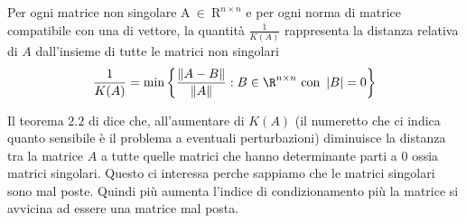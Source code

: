 \documentclass{article}
\begin{document}
\begin{theorem}
  Per ogni matrice non singolare $\mathrm{A} \ \mathrm{\in} \ \mathrm{R}^{n\times n}$ e per ogni norma di matrice compatibile con
una di vettore, la quantità $\frac{1 }{K(A)}$  rappresenta la distanza relativa di $A$ dall’insieme di tutte le matrici non singolari
$$
\frac{1}{K(A)}=\min\left\{\frac{\left\|A-B\right\|}{\left\|A\right\|}:B\in\R^{n\times n} \text{ con } \left|B\right|=0\right\}
$$
\end{theorem}
Il teorema $2.2$ di dice che, all'aumentare di $K(A)$ (il numeretto che ci indica quanto sensibile è il problema a eventuali perturbazioni) diminuisce la distanza tra la matrice $A $ a tutte quelle matrici che hanno determinante parti a $0$ ossia matrici singolari. Questo ci interessa perche sappiamo che le matrici singolari sono mal poste. Quindi più aumenta l'indice di condizionamento più la matrice si avvicina ad essere una matrice mal posta. 
\end{document}
